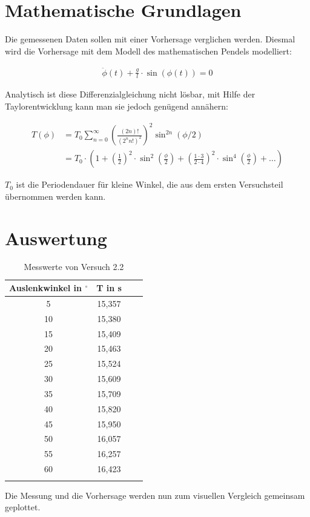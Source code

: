 \section{Mathematische Grundlagen}

Die gemessenen Daten sollen mit einer Vorhersage verglichen werden.
Diesmal wird die Vorhersage mit dem Modell des mathematischen Pendels modelliert:

\begin{align}
	\ddot{\phi}(t) + \frac{g}{l} \cdot \sin ( \phi (t)) = 0
\end{align}

Analytisch ist diese Differenzialgleichung nicht lösbar, mit Hilfe der Taylorentwicklung kann man sie jedoch genügend annähern:

\begin{align}
	T(\phi) & = T_0 \sum_{n=0}^{\infty} \left( \frac{\left(2n\right)!}{\left(2^{n}n!\right)^2} \right)^2 \sin^{2n} \left(\phi /2\right) \\
& = T_0\cdot\left(1+\left(\frac{1}{2}\right)^2 \cdot \sin^2\left(\frac{\phi}{2}\right)+\left(\frac{1\cdot 3}{2\cdot 4}\right)^2 \cdot \sin^4\left(\frac{\phi}{2}\right) + \dots\right)
\end{align}

$T_0$ ist die Periodendauer für kleine Winkel, die aus dem ersten Versuchsteil übernommen werden kann.

\section{Auswertung}

\begin{table}[h!]
    \begin{center}
        \caption{Messwerte von Versuch 2.2}
        \begin{tabular}{cccc}
            \hline
            Auslenkwinkel in $ ^{\circ}$ & T in s \\
            \hline
            5                  & 15,357 \\
            10                & 15,380 \\
            15                & 15,409 \\
            20                & 15,463 \\
            25                & 15,524 \\
            30                & 15,609 \\
            35                & 15,709 \\
            40                & 15,820 \\
            45                & 15,950 \\
            50                & 16,057 \\
            55                & 16,257 \\
            60                & 16,423 \\
            \hline
            \label{tab:2_2-werte}
        \end{tabular}
    \end{center}
\end{table}


Die Messung und die Vorhersage werden nun zum visuellen Vergleich gemeinsam geplottet.

